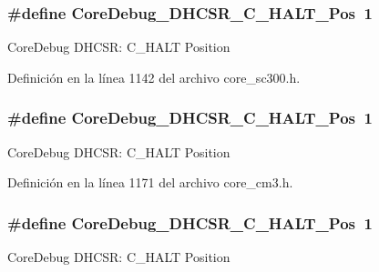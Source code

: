\subsubsection[{\texorpdfstring{Core\+Debug\+\_\+\+D\+H\+C\+S\+R\+\_\+\+C\+\_\+\+H\+A\+L\+T\+\_\+\+Pos}{CoreDebug_DHCSR_C_HALT_Pos}}]{\setlength{\rightskip}{0pt plus 5cm}\#define Core\+Debug\+\_\+\+D\+H\+C\+S\+R\+\_\+\+C\+\_\+\+H\+A\+L\+T\+\_\+\+Pos~1}\hypertarget{group___c_m_s_i_s___core_debug_gaddf1d43f8857e4efc3dc4e6b15509692}{}\label{group___c_m_s_i_s___core_debug_gaddf1d43f8857e4efc3dc4e6b15509692}
Core\+Debug D\+H\+C\+SR\+: C\+\_\+\+H\+A\+LT Position 

Definición en la línea 1142 del archivo core\+\_\+sc300.\+h.

\subsubsection[{\texorpdfstring{Core\+Debug\+\_\+\+D\+H\+C\+S\+R\+\_\+\+C\+\_\+\+H\+A\+L\+T\+\_\+\+Pos}{CoreDebug_DHCSR_C_HALT_Pos}}]{\setlength{\rightskip}{0pt plus 5cm}\#define Core\+Debug\+\_\+\+D\+H\+C\+S\+R\+\_\+\+C\+\_\+\+H\+A\+L\+T\+\_\+\+Pos~1}\hypertarget{group___c_m_s_i_s___core_debug_gaddf1d43f8857e4efc3dc4e6b15509692}{}\label{group___c_m_s_i_s___core_debug_gaddf1d43f8857e4efc3dc4e6b15509692}
Core\+Debug D\+H\+C\+SR\+: C\+\_\+\+H\+A\+LT Position 

Definición en la línea 1171 del archivo core\+\_\+cm3.\+h.

\subsubsection[{\texorpdfstring{Core\+Debug\+\_\+\+D\+H\+C\+S\+R\+\_\+\+C\+\_\+\+H\+A\+L\+T\+\_\+\+Pos}{CoreDebug_DHCSR_C_HALT_Pos}}]{\setlength{\rightskip}{0pt plus 5cm}\#define Core\+Debug\+\_\+\+D\+H\+C\+S\+R\+\_\+\+C\+\_\+\+H\+A\+L\+T\+\_\+\+Pos~1}\hypertarget{group___c_m_s_i_s___core_debug_gaddf1d43f8857e4efc3dc4e6b15509692}{}\label{group___c_m_s_i_s___core_debug_gaddf1d43f8857e4efc3dc4e6b15509692}
Core\+Debug D\+H\+C\+SR\+: C\+\_\+\+H\+A\+LT Position 

